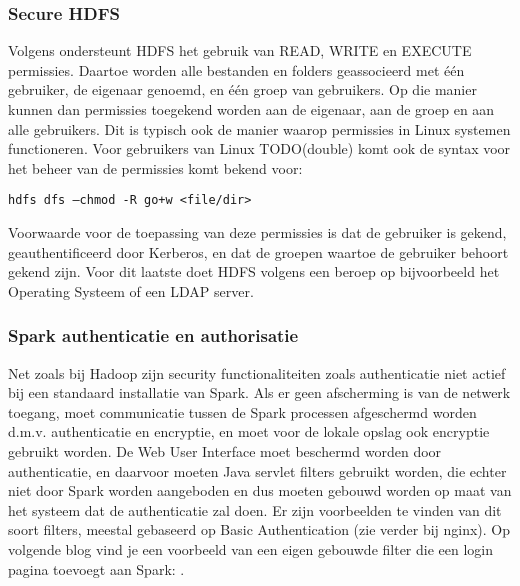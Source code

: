 \subsubsection{Secure HDFS}
Volgens \textcite{Hadoop2023b} ondersteunt HDFS het gebruik van READ, WRITE en EXECUTE permissies. Daartoe worden alle bestanden en folders geassocieerd met één gebruiker, de eigenaar genoemd, en één groep van gebruikers.
Op die manier kunnen dan permissies toegekend worden aan de eigenaar, aan de groep en aan alle gebruikers. Dit is typisch ook de manier waarop permissies in Linux systemen functioneren.
\newline
Voor gebruikers van Linux TODO(double) komt ook de syntax voor het beheer van de permissies komt bekend voor:
\begin{lstlisting}
hdfs dfs –chmod -R go+w <file/dir>
\end{lstlisting}
Voorwaarde voor de toepassing van deze permissies is dat de gebruiker is gekend, geauthentificeerd door Kerberos, en dat de groepen waartoe de gebruiker behoort gekend zijn. Voor dit laatste doet HDFS volgens \textcite{Hadoop2023c} een beroep op bijvoorbeeld het Operating Systeem of een LDAP server.


\subsubsection {Spark authenticatie en authorisatie} \autocite{Spark2023c}
Net zoals bij Hadoop zijn security functionaliteiten zoals authenticatie niet actief bij een standaard installatie van Spark. Als er geen afscherming is van de netwerk toegang, moet communicatie tussen de Spark processen afgeschermd worden d.m.v. authenticatie en encryptie, en moet voor de lokale opslag ook encryptie gebruikt worden. De Web User Interface moet beschermd worden door authenticatie, en daarvoor moeten Java servlet filters gebruikt worden, die echter niet door Spark worden aangeboden en dus moeten gebouwd worden op maat van het systeem dat de authenticatie zal doen.
Er zijn voorbeelden te vinden van dit soort filters, meestal gebaseerd op Basic Authentication (zie verder bij nginx). Op volgende blog vind je een voorbeeld van een eigen gebouwde filter die een login pagina toevoegt aan Spark: \textcite{Cacoveanu2019}.
\newline
\newline


